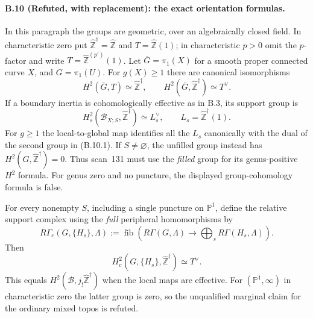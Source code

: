 \paragraph{B.10 (Refuted, with replacement): the exact orientation formulas.}\label{B10}
In this paragraph the groups are geometric, over an
algebraically closed field. In characteristic zero put
$\widehat{\mathbb Z}^{\dagger}=\widehat{\mathbb Z}$ and
$T=\widehat{\mathbb Z}(1)$; in characteristic $p>0$ omit the
$p$-factor and write $T=\widehat{\mathbb Z}^{(p')}(1)$.
Let $\overline G=\pi_1(X)$ for a smooth proper connected
curve $X$, and $G=\pi_1(U)$. For $g(X)\geq1$ there are
canonical isomorphisms
\[
 H^2(\overline G,T)\simeq\widehat{\mathbb Z}^{\dagger},
 \qquad H^2(\overline G,\widehat{\mathbb Z}^{\dagger})
                         \simeq T^\vee.                    \tag{B.10.1}
\]
If a boundary inertia is cohomologically effective as in
B.3, its support group is
\[
 H^2_s(\mathcal B_{X;S},\widehat{\mathbb Z}^{\dagger})
       \simeq L_s^\vee,\qquad
       L_s=\widehat{\mathbb Z}^{\dagger}(1).                \tag{B.10.2}
\]
For $g\geq1$ the local-to-global map identifies all the
$L_s$ canonically with the dual of the second group in
(B.10.1). If $S\ne\varnothing$, the unfilled group instead
has
$H^2(G,\widehat{\mathbb Z}^{\dagger})=0$.
Thus scan~131 must use the \emph{filled} group for its
genus-positive $H^2$ formula. For genus zero and no puncture,
the displayed group-cohomology formula is false.

For every nonempty $S$, including a single puncture on
$\mathbb P^1$, define the relative support complex using the
\emph{full} peripheral homomorphisms by
\[
 R\Gamma_c(G,\{H_s\},\Lambda)
 :=\operatorname{fib}\left(R\Gamma(G,\Lambda)
                  \longrightarrow\bigoplus_sR\Gamma(H_s,\Lambda)\right).
                                                               \tag{B.10.3}
\]
Then
\[
 H^2_c(G,\{H_s\},\widehat{\mathbb Z}^{\dagger})\simeq T^\vee.
                                                               \tag{B.10.4}
\]
This equals $H^2(\mathcal B,j_!\widehat{\mathbb Z}^{\dagger})$
when the local maps are effective. For
$(\mathbb P^1,\infty)$ in characteristic zero the latter
group is zero, so the unqualified marginal claim for the
ordinary mixed topos is refuted.

